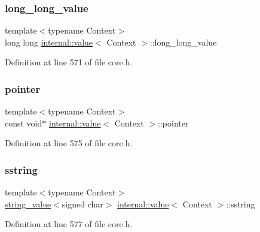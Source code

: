 \subsubsection{\texorpdfstring{long\+\_\+long\+\_\+value}{long\_long\_value}}
{\footnotesize\ttfamily template$<$typename Context$>$ \\
long long \hyperlink{classinternal_1_1value}{internal\+::value}$<$ Context $>$\+::long\+\_\+long\+\_\+value}



Definition at line 571 of file core.\+h.

\mbox{\label{classinternal_1_1value_a9fa6472bcb2e3d35381324954b9f8838}} 
\subsubsection{\texorpdfstring{pointer}{pointer}}
{\footnotesize\ttfamily template$<$typename Context$>$ \\
const void$\ast$ \hyperlink{classinternal_1_1value}{internal\+::value}$<$ Context $>$\+::pointer}



Definition at line 575 of file core.\+h.

\mbox{\label{classinternal_1_1value_a6f59d2e71caf031b46adfd9bc3ab9383}} 
\subsubsection{\texorpdfstring{sstring}{sstring}}
{\footnotesize\ttfamily template$<$typename Context$>$ \\
\hyperlink{structinternal_1_1string__value}{string\+\_\+value}$<$signed char$>$ \hyperlink{classinternal_1_1value}{internal\+::value}$<$ Context $>$\+::sstring}



Definition at line 577 of file core.\+h.

\mbox{\label{classinternal_1_1value_a36bb89e179b0c0ad545faa47647bfdc3}} 
